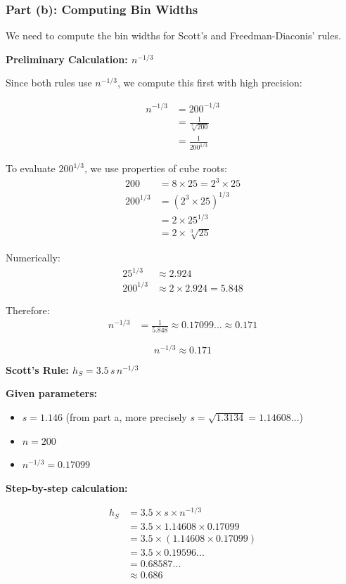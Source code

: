 \documentclass[12pt]{article}
\begin{document}
\subsubsection{Part (b): Computing Bin Widths}

\begin{solution}
We need to compute the bin widths for Scott's and Freedman-Diaconis' rules.

\textbf{Preliminary Calculation: \(n^{-1/3}\)}

Since both rules use \(n^{-1/3}\), we compute this first with high precision:

\begin{align*}
n^{-1/3} &= 200^{-1/3} \\
&= \frac{1}{\sqrt[3]{200}} \\
&= \frac{1}{200^{1/3}}
\end{align*}

To evaluate \(200^{1/3}\), we use properties of cube roots:
\begin{align*}
200 &= 8 \times 25 = 2^3 \times 25 \\
200^{1/3} &= (2^3 \times 25)^{1/3} \\
&= 2 \times 25^{1/3} \\
&= 2 \times \sqrt[3]{25}
\end{align*}

Numerically:
\begin{align*}
25^{1/3} &\approx 2.924 \\
200^{1/3} &\approx 2 \times 2.924 = 5.848
\end{align*}

Therefore:
\begin{align*}
n^{-1/3} &= \frac{1}{5.848} \approx 0.17099... \approx 0.171
\end{align*}

\[
\boxed{n^{-1/3} \approx 0.171}
\]

\textbf{Scott's Rule: \(h_S = 3.5\,s\,n^{-1/3}\)}

\textbf{Given parameters:}
\begin{itemize}
    \item \(s = 1.146\) (from part a, more precisely \(s = \sqrt{1.3134} = 1.14608...\))
    \item \(n = 200\)
    \item \(n^{-1/3} = 0.17099\)
\end{itemize}

\textbf{Step-by-step calculation:}

\begin{align*}
h_S &= 3.5 \times s \times n^{-1/3} \\
&= 3.5 \times 1.14608 \times 0.17099 \\
&= 3.5 \times (1.14608 \times 0.17099) \\
&= 3.5 \times 0.19596... \\
&= 0.68587... \\
&\approx 0.686
\end{align*}


\end{solution}
\end{document}
